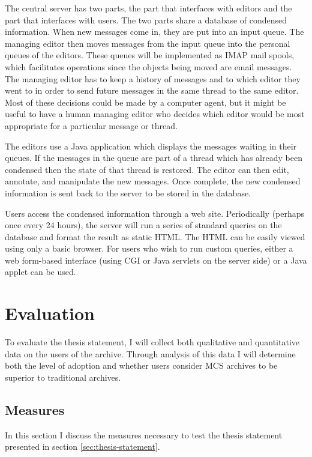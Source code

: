 The central server has two parts, the part that interfaces with editors and the
part that interfaces with users. The two parts share a database of condensed
information. When new messages come in, they are put into an input queue. The
managing editor then moves messages from the input queue into the personal
queues of the editors. These queues will be implemented as IMAP mail spools,
which facilitates operations since the objects being moved are email messages.
The managing editor has to keep a history of messages and to which editor they
went to in order to send future messages in the same thread to the same editor.
Most of these decisions could be made by a computer agent, but it might be
useful to have a human managing editor who decides which editor would be most
appropriate for a particular message or thread.

The editors use a Java application which displays the messages waiting in their
queues. If the messages in the queue are part of a thread which has already
been condensed then the state of that thread is restored. The editor can then
edit, annotate, and manipulate the new messages. Once complete, the new
condensed information is sent back to the server to be stored in the database.

Users access the condensed information through a web site. Periodically
(perhaps once every 24 hours), the server will run a series of standard queries
on the database and format the result as static HTML. The HTML can be easily
viewed using only a basic browser. For users who wish to run custom queries,
either a web form-based interface (using CGI or Java servlets on the server
side) or a Java applet can be used.


\chapter{Evaluation}
To evaluate the thesis statement, I will collect both qualitative and
quantitative data on the users of the archive. Through analysis of this data I 
will determine both the level of adoption and whether users consider MCS
archives to be superior to traditional archives.

\section{Measures}
\label{sec:measures}
In this section I discuss the measures necessary to test the thesis statement
presented in section \ref{sec:thesis-statement}.

